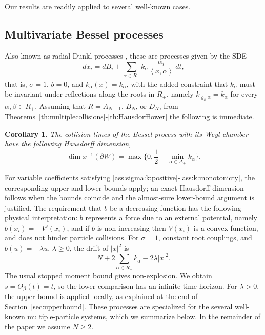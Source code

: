 \documentclass{article}
\numberwithin{equation}{section}
\newcommand{\C}{W}
\newcommand{\Cb}{\partial \C}
\newcommand{\xa}{\left<x,\alpha\right>}
\newcommand{\SaR}{\sum_{\alpha\in R_+}}
\newcommand{\reflect}[1]{\varrho_{#1}}
\newcommand{\SimplePlus}{\Delta_+}
\theoremstyle{plain}
\newtheorem{corollary}[theorem]{Corollary}
\begin{document}
    Our results are readily applied to several well-known cases.
    \subsection{Multivariate Bessel processes}

    Also known as radial Dunkl processes \cite{RoslerVoit98,GallardoYor05}, these are processes given by the SDE
    \[dx_i=dB_i+\SaR k_\alpha\frac{\alpha_i}{\xa}\,dt,\]
    that is, $\sigma=1$, $b=0$, and $k_\alpha(x)=k_\alpha$, with the added constraint that $k_\alpha$ must be invariant under reflections along the roots in $R_+$, namely $k_{\reflect{\beta}\alpha}=k_\alpha$ for every $\alpha,\beta\in R_+$. Assuming that $R=A_{N-1}$, $B_N$, or $D_N$, from Theorems~\ref{th:multiplecollisions}-\ref{th:Hausdorfflower} the following is immediate.
    \begin{corollary}
        The collision times of the Bessel process with its Weyl chamber have the following Hausdorff dimension,
        \[\dim x^{-1}(\Cb)=\max\Big\{0,\frac12-\min_{\alpha\in\SimplePlus}k_\alpha\Big\}.\]
        \label{cor:multiBessel}
    \end{corollary}
    For variable coefficients satisfying \ref{ass:sigma:k:positive}-\ref{ass:k:monotonicty}, the corresponding upper and lower bounds apply; an exact Hausdorff dimension follows when the bounds coincide and the almost-sure lower-bound argument is justified. The requirement that $b$ be a decreasing function has the following physical interpretation: $b$ represents a force due to an external potential, namely $b(x_i)=-V'(x_i)$, and if $b$ is non-increasing then $V(x_i)$ is a convex function, and does not hinder particle collisions. For $\sigma=1$, constant root couplings, and $b(u)=-\lambda u$, $\lambda\geq0$, the drift of $|x|^2$ is
    \[
        N+2\sum_{\alpha\in R_+}k_\alpha-2\lambda|x|^2.
    \]
    The usual stopped moment bound gives non-explosion. We obtain $s=\Theta_\beta(t)=t$, so the lower comparison has an infinite time horizon. For $\lambda>0$, the upper bound is applied locally, as explained at the end of Section~\ref{sec:upperbound}. These processes are specialized for the several well-known multiple-particle systems, which we summarize below. In the remainder of the paper we assume $N\geq2$.
\end{document}

